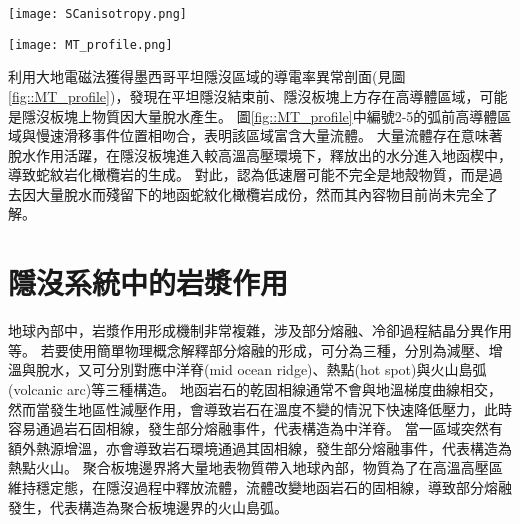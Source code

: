 \begin{figure*}[ht!]
    \centering
    \texttt{[image: SCanisotropy.png]}
    \caption[墨西哥隱沒帶板塊介面附近剪切帶結構示意圖，摘自\citet{Song2012SC}]{墨西哥隱沒帶板塊介面附近剪切帶結構示意圖，摘自\citet{Song2012SC}。大地震主要發生在鎖定區(locked zone)和脆性(brittle)變形區域。慢速滑移事件(slow-slip event)主要發生在過渡帶(transition zone)和半韌性區域(seni-ductile regime)，V$_S$非常低，且非均向性極強。這些低速帶流體導致板塊介面處於弱耦合狀態，並且主導該地區慢速滑移事件的生成。
    }
    \label{fig::SCanisotorpy2012}
\end{figure*}


\begin{figure*}[ht!]
    \centering
    \texttt{[image: MT\_profile.png]}
    \caption[墨西哥平坦隱沒區域的導電率異常剖面圖與解釋圖，摘自\citet{MT2006}]{墨西哥平坦隱沒區域的導電率異常剖面圖與解釋圖，摘自\citet{MT2006}。上圖為電阻率異常結果剖面，所繪之隱沒板塊位置參考自\citet{pardo1995}結果，最上方標示跨墨西哥火山帶的範圍。圖中每個數字圈皆代表隱沒帶上岩石發生脫水的位置，1為黏土礦物的脫水，2為藍片岩相變至綠簾石發生的脫水，3為綠簾石相變至榴輝岩的脫水，4為隱沒板塊上綠泥石的脫水，5為角閃石的脫水。下圖為電阻異常解釋圖，綠色區域為電阻異常低區(<100 $\Omega m$)。在平坦隱沒段結束處有多個岩石相變事件發生，隱沒板塊上出現大範圍導體。
    }
    \label{fig::MT_profile}
\end{figure*}

\citet{MT2006}利用大地電磁法獲得墨西哥平坦隱沒區域的導電率異常剖面(見圖\ref{fig::MT_profile})，發現在平坦隱沒結束前、隱沒板塊上方存在高導體區域，可能是隱沒板塊上物質因大量脫水產生。
圖\ref{fig::MT_profile}中編號2-5的弧前高導體區域與慢速滑移事件位置相吻合，表明該區域富含大量流體。
大量流體存在意味著脫水作用活躍，在隱沒板塊進入較高溫高壓環境下，釋放出的水分進入地函楔中，導致蛇紋岩化橄欖岩的生成。
對此，\citet{Manea2013}認為低速層可能不完全是地殼物質，而是過去因大量脫水而殘留下的地函蛇紋化橄欖岩成份，然而其內容物目前尚未完全了解。

\section{隱沒系統中的岩漿作用}\label{隱沒系統中的岩漿作用}
地球內部中，岩漿作用形成機制非常複雜，涉及部分熔融、冷卻過程結晶分異作用等。
若要使用簡單物理概念解釋部分熔融的形成，可分為三種，分別為減壓、增溫與脫水，又可分別對應中洋脊(mid ocean ridge)、熱點(hot spot)與火山島弧(volcanic arc)等三種構造。
地函岩石的乾固相線通常不會與地溫梯度曲線相交，然而當發生地區性減壓作用，會導致岩石在溫度不變的情況下快速降低壓力，此時容易通過岩石固相線，發生部分熔融事件，代表構造為中洋脊。
當一區域突然有額外熱源增溫，亦會導致岩石環境通過其固相線，發生部分熔融事件，代表構造為熱點火山。
聚合板塊邊界將大量地表物質帶入地球內部，物質為了在高溫高壓區維持穩定態，在隱沒過程中釋放流體，流體改變地函岩石的固相線，導致部分熔融發生，代表構造為聚合板塊邊界的火山島弧。

